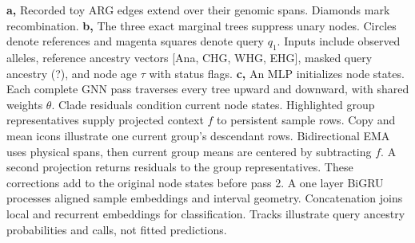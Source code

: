 \textbf{a,} Recorded toy ARG edges extend over their genomic spans. Diamonds mark recombination.
\textbf{b,} The three exact marginal trees suppress unary nodes. Circles denote references and magenta squares denote query $q_1$. Inputs include observed alleles, reference ancestry vectors [Ana, CHG, WHG, EHG], masked query ancestry (?), and node age $\tau$ with status flags.
\textbf{c,} An MLP initializes node states. Each complete GNN pass traverses every tree upward and downward, with shared weights $\theta$. Clade residuals condition current node states. Highlighted group representatives supply projected context $f$ to persistent sample rows. Copy and mean icons illustrate one current group's descendant rows. Bidirectional EMA uses physical spans, then current group means are centered by subtracting $f$. A second projection returns residuals to the group representatives. These corrections add to the original node states before pass 2. A one layer BiGRU processes aligned sample embeddings and interval geometry. Concatenation joins local and recurrent embeddings for classification. Tracks illustrate query ancestry probabilities and calls, not fitted predictions.
